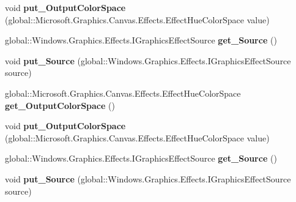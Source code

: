 \begin{DoxyCompactItemize}
void {\bfseries put\+\_\+\+Output\+Color\+Space} (global\+::\+Microsoft.\+Graphics.\+Canvas.\+Effects.\+Effect\+Hue\+Color\+Space value)
\item 
\mbox{\label{interface_microsoft_1_1_graphics_1_1_canvas_1_1_effects_1_1_i_rgb_to_hue_effect_a84ea69b21839d230f7b651c8ff534060}} 
global\+::\+Windows.\+Graphics.\+Effects.\+I\+Graphics\+Effect\+Source {\bfseries get\+\_\+\+Source} ()
\item 
\mbox{\label{interface_microsoft_1_1_graphics_1_1_canvas_1_1_effects_1_1_i_rgb_to_hue_effect_a97e678d785f29e1d365bec9a84fc3940}} 
void {\bfseries put\+\_\+\+Source} (global\+::\+Windows.\+Graphics.\+Effects.\+I\+Graphics\+Effect\+Source source)
\item 
\mbox{\label{interface_microsoft_1_1_graphics_1_1_canvas_1_1_effects_1_1_i_rgb_to_hue_effect_a53da861c46cdef87c6cdd66a1baf9798}} 
global\+::\+Microsoft.\+Graphics.\+Canvas.\+Effects.\+Effect\+Hue\+Color\+Space {\bfseries get\+\_\+\+Output\+Color\+Space} ()
\item 
\mbox{\label{interface_microsoft_1_1_graphics_1_1_canvas_1_1_effects_1_1_i_rgb_to_hue_effect_ad8679afd320843650369bba783e11405}} 
void {\bfseries put\+\_\+\+Output\+Color\+Space} (global\+::\+Microsoft.\+Graphics.\+Canvas.\+Effects.\+Effect\+Hue\+Color\+Space value)
\item 
\mbox{\label{interface_microsoft_1_1_graphics_1_1_canvas_1_1_effects_1_1_i_rgb_to_hue_effect_a84ea69b21839d230f7b651c8ff534060}} 
global\+::\+Windows.\+Graphics.\+Effects.\+I\+Graphics\+Effect\+Source {\bfseries get\+\_\+\+Source} ()
\item 
\mbox{\label{interface_microsoft_1_1_graphics_1_1_canvas_1_1_effects_1_1_i_rgb_to_hue_effect_a97e678d785f29e1d365bec9a84fc3940}} 
void {\bfseries put\+\_\+\+Source} (global\+::\+Windows.\+Graphics.\+Effects.\+I\+Graphics\+Effect\+Source source)

\end{DoxyCompactItemize}
